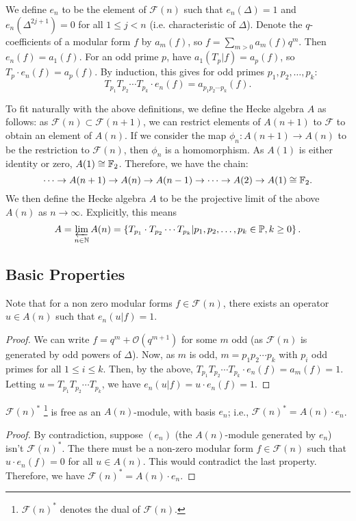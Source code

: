 We define $e_n$ to be the element of $\mathcal{F}(n)$ such that $e_n(\Delta) = 1$ and $e_n(\Delta^{2j+1}) = 0$ for all $1 \leq j <n$ (i.e. characteristic of $\Delta$).
Denote the $q$-coefficients of a modular form $f$ by $a_m(f)$, so $f = \sum_{m>0} a_m(f)q^m$.
Then $e_n(f) = a_1(f)$.
For an odd prime $p$, have $a_1(T_p|f) = a_p(f)$, so $T_p \cdot e_n(f) = a_p(f)$.
By induction, this gives for odd primes $p_1, p_2, \dots, p_k$:
$$
T_{p_1} T_{p_2} \cdots T_{p_k} \cdot e_n(f) 
= a_{p_1 p_2\cdots p_k}(f).
$$

To fit naturally with the above definitions, we define the Hecke algebra $A$ as follows:
as $\mathcal{F}(n) \subset \mathcal{F}(n+1)$, we can restrict elements of $A(n+1)$ to $\mathcal{F}$ to obtain an element of $A(n)$.
If we consider the map $\phi_n: A(n+1) \to A(n)$ to be the restriction to $\mathcal{F}(n)$, then $\phi_n$ is a homomorphism.
As $A(1)$ is either identity or zero, $A(1) \cong \mathbb{F}_2$.
Therefore, we have the chain:
$$
\dots \to A(n+1) \to A(n) \to A(n-1) \to \dots \to A(2) \to A(1) \cong \mathbb{F}_2.
$$
We then define the Hecke algebra $A$ to be the projective limit of the above $A(n)$ as $n \to \infty$.
Explicitly, this means
$$
A = \varprojlim_{n \in \mathbb{N}} A(n) = \left\lbrace T_{p_1} \cdot T_{p_2} \cdots T_{p_k} | p_1, p_2, \dots, p_k \in \mathbb{P}, k\geq 0 \right\rbrace .
$$



\subsection{Basic Properties}

\begin{property}
	Note that for a non zero modular forms $f \in \mathcal{F}(n)$, there exists an operator $u \in A(n)$ such that $e_n(u|f) = 1$.
\end{property}
\begin{proof}
	We can write $f = q^m + \mathcal{O}(q^{m+1})$ for some $m$ odd (as $\mathcal{F}(n)$ is generated by odd powers of $\Delta$).
	Now, as $m$ is odd, $m=p_1 p_2 \cdots p_k$ with $p_i$ odd primes for all $1 \leq i \leq k$.
	Then, by the above, $T_{p_1} T_{p_2} \cdots T_{p_k} \cdot e_n(f) = a_m(f) = 1$.
	Letting $u = T_{p_1} T_{p_2} \cdots T_{p_k}$, we have $e_n(u|f) = u \cdot e_n(f) = 1$.
\end{proof}

\begin{property}
	$\mathcal{F}(n)^*$ \footnote{$\mathcal{F}(n)^*$ denotes the dual of $\mathcal{F}(n)$.} is free as an $A(n)$-module, with basis $e_n$;	
	i.e., $\mathcal{F}(n)^* = A(n) \cdot e_n$.
\end{property}
\begin{proof}
	By contradiction, suppose $(e_n)$ (the $A(n)$-module generated by $e_n$) isn't $\mathcal{F}(n)^*$.
	The there must be a non-zero modular form $f \in \mathcal{F}(n)$ such that $u \cdot e_n(f)=0$ for all $u \in A(n)$.
	This would contradict the last property.
	Therefore, we have $\mathcal{F}(n)^* = A(n) \cdot e_n$.
\end{proof}

